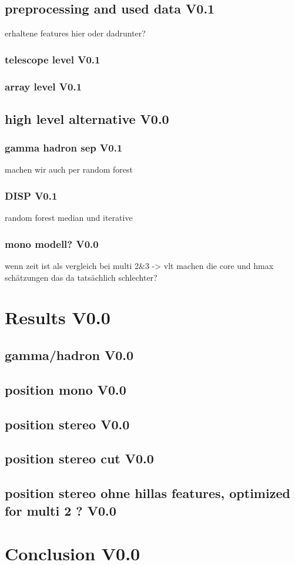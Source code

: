 \section{preprocessing  and used data V0.1}
erhaltene features hier oder dadrunter?
\subsection{telescope level V0.1}
\subsection{array level V0.1}
\section{high level alternative V0.0}
\subsection{gamma hadron sep V0.1}
machen wir auch per random forest 
\subsection{DISP V0.1}
random forest
median und iterative
\subsection{mono modell? V0.0}
wenn zeit ist als vergleich bei multi 2\&3
-> vlt machen die core und hmax schätzungen das da tatsächlich schlechter?

\chapter{Results V0.0}
\section{gamma/hadron V0.0}
\section{position mono V0.0}
\section{position stereo V0.0}
\section{position stereo cut V0.0}
\section{position stereo ohne hillas features, optimized for multi 2 ? V0.0}

\chapter{Conclusion V0.0}
